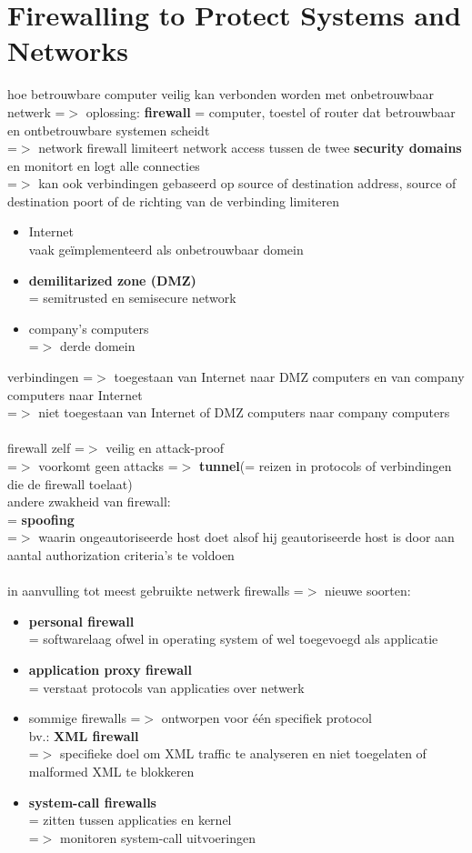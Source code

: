 \documentclass{report}
\begin{document}
\section{Firewalling to Protect Systems and Networks}
hoe betrouwbare computer veilig kan verbonden worden met onbetrouwbaar netwerk
=$>$ oplossing: \textbf{firewall} = computer, toestel of router dat betrouwbaar en ontbetrouwbare systemen scheidt
\\=$>$ network firewall limiteert network access tussen de twee \textbf{security domains} en monitort en logt alle connecties
\\=$>$ kan ook verbindingen gebaseerd op source of destination address, source of destination poort of de richting van de verbinding limiteren
\\
\begin{itemize}
\item Internet
\\vaak ge\"implementeerd als onbetrouwbaar domein
\item \textbf{demilitarized zone (DMZ)}
\\= semitrusted en semisecure network
\item company's computers
\\=$>$ derde domein
\end{itemize}
verbindingen =$>$ toegestaan van Internet naar DMZ computers en van company computers naar Internet 
\\=$>$ niet toegestaan van Internet of DMZ computers naar company computers
\\
\\firewall zelf =$>$ veilig en attack-proof
\\=$>$ voorkomt geen attacks =$>$ \textbf{tunnel}(= reizen in protocols of verbindingen die de firewall toelaat)
\\andere zwakheid van firewall:
\\ = \textbf{spoofing}
\\=$>$ waarin ongeautoriseerde host doet alsof hij geautoriseerde host is door aan aantal authorization criteria's te voldoen
\\
\\in aanvulling tot meest gebruikte netwerk firewalls =$>$ nieuwe soorten:
\begin{itemize}
\item \textbf{personal firewall}
\\= softwarelaag ofwel in operating system of wel toegevoegd als applicatie
\item \textbf{application proxy firewall}
\\= verstaat protocols van applicaties over netwerk
\item sommige firewalls =$>$ ontworpen voor \'e\'en specifiek protocol
\\bv.: \textbf{XML firewall}
\\=$>$ specifieke doel om XML traffic te analyseren en niet toegelaten of malformed XML te blokkeren
\item \textbf{system-call firewalls}
\\= zitten tussen applicaties en kernel
\\=$>$ monitoren system-call uitvoeringen
\end{itemize}
\end{document}
